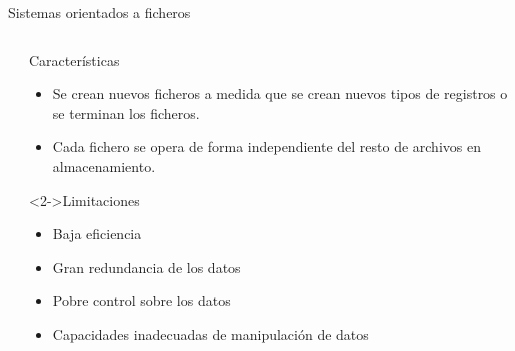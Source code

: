\begin{frame}{Sistemas orientados a ficheros}
\begin{columns}[T]
\begin{column}{0.30\linewidth}
    \end{column}

    


        \begin{column}{0.68\linewidth}
            \begin{block}{Caracter\'isticas}
                \begin{itemize}
                    \item Se crean nuevos ficheros a medida que se crean nuevos tipos de registros o se terminan los ficheros.
                    \item Cada fichero se opera de forma independiente del resto de archivos en almacenamiento.
                \end{itemize}
                 
            \end{block}
            \begin{alertblock}<2->{Limitaciones}
                \begin{itemize}
                    \item<2-> Baja eficiencia
                    \item<3-> Gran redundancia de los datos
                    \item<4-> Pobre control sobre los datos
                    \item<5-> Capacidades inadecuadas de manipulaci\'on de datos
                \end{itemize}
            \end{alertblock}
        \end{column}

    \end{columns}
\end{frame}
